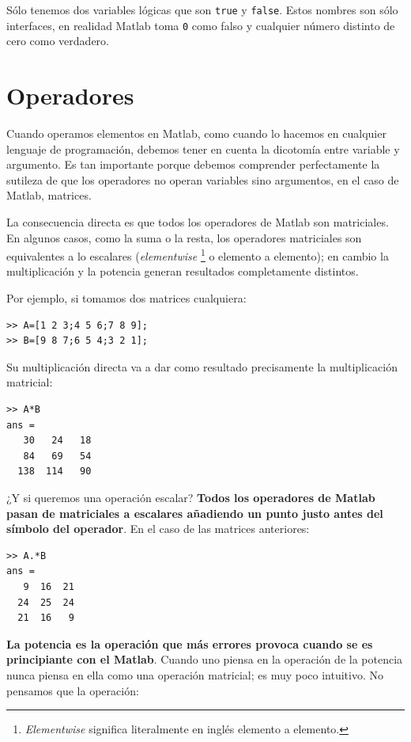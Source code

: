 Sólo tenemos dos variables lógicas que son \texttt{true} y
\texttt{false}.  Estos nombres son sólo interfaces, en realidad Matlab
toma \texttt{0} como falso y cualquier número distinto de cero como verdadero.


\section{Operadores}

Cuando operamos elementos en Matlab, como cuando lo hacemos en
cualquier lenguaje de programación, debemos tener en cuenta la
dicotomía entre variable y argumento. Es tan importante porque debemos
comprender perfectamente la sutileza de que los operadores no operan
variables sino argumentos, en el caso de Matlab, matrices.

La consecuencia directa es que todos los operadores de Matlab son
matriciales. En algunos casos, como la suma o la resta, los operadores
matriciales son equivalentes a lo escalares (\emph{elementwise}%
\footnote{\emph{Elementwise} significa literalmente en inglés elemento
  a elemento.%
} o elemento a elemento); en cambio la multiplicación y la potencia
generan resultados completamente distintos.

Por ejemplo, si tomamos dos matrices cualquiera:

\begin{verbatim}
>> A=[1 2 3;4 5 6;7 8 9];
>> B=[9 8 7;6 5 4;3 2 1];
\end{verbatim}

Su multiplicación directa va a dar como resultado precisamente la
multiplicación matricial:

\begin{verbatim}
>> A*B
ans =
   30   24   18
   84   69   54
  138  114   90
\end{verbatim}
¿Y si queremos una operación escalar? \textbf{Todos los operadores de
  Matlab pasan de matriciales a escalares añadiendo un punto justo
  antes del símbolo del operador}. En el caso de las matrices
anteriores:

\begin{verbatim}
>> A.*B
ans =
   9  16  21
  24  25  24
  21  16   9
\end{verbatim}
\textbf{La potencia es la operación que más errores provoca cuando se
  es principiante con el Matlab}. Cuando uno piensa en la operación de
la potencia nunca piensa en ella como una operación matricial; es muy
poco intuitivo. No pensamos que la operación:

